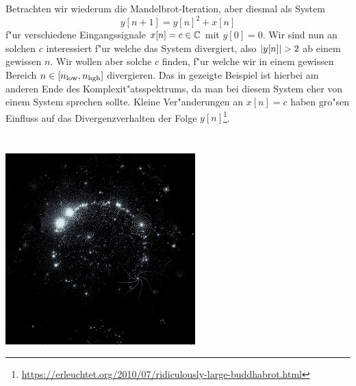 Betrachten wir wiederum die Mandelbrot-Iteration, aber diesmal als System
\[
    y[n+1] = y[n]^2 + x[n]
\]
f"ur verschiedene Eingangssignale $x[n] = c \in \mathbb{C}$ mit $y[0] = 0$.
Wir sind nun an solchen $c$ interessiert f"ur welche das System divergiert, also ${\left| y[n] \right|} > 2$ ab einem gewissen $n$.
Wir wollen aber solche $c$ finden, f"ur welche wir in einem gewissen Bereich $n \in [n_{\rm low}, n_{\rm hgh}]$ divergieren.
Das in  gezeigte Beispiel ist hierbei am anderen Ende des Komplexit"atsspektrums, da man bei diesem System eher von einem  System sprechen sollte. 
Kleine Ver"anderungen an $x[n] = c$ haben gro"sen Einfluss auf das Divergenzverhalten der Folge $y[n]$\footnote{\url{https://erleuchtet.org/2010/07/ridiculously-large-buddhabrot.html}}.
\begin{listing}
    \noindent
    \begin{minipage}{0.49\textwidth}
        \strut\vspace*{-\baselineskip}\newline
        \inputminted[firstline=5,lastline=26]{python3}{code/buddhabrot.py}
    \end{minipage}%
    \begin{minipage}{0.49\textwidth}
        \strut\vspace*{-\baselineskip}\newline
        \inputminted[firstline=29,lastline=53]{python3}{code/buddhabrot.py}
    \end{minipage}

    \begin{center}
        \includegraphics[width=0.55\textwidth]{code/buddhabrot.png}
    \end{center}
    \label{py:buddhabrot}
\end{listing}

